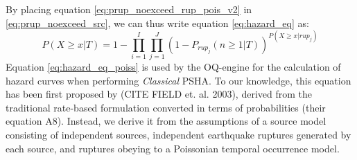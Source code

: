 By placing equation \ref{eq:prup_noexceed_rup_pois_v2} in \ref{eq:prup_noexceed_src}, we can thus
write equation \ref{eq:hazard_eq} as:
\begin{equation}
\label{eq:hazard_eq_poiss}
P(X \ge x | T) =  1 - \prod_{i=1}^{I} \prod_{j=1}^{J} (1 - P_{rup_{j}}(n \ge 1 | T))^{P(X \ge x | rup_{j})}
\end{equation}
Equation \ref{eq:hazard_eq_poiss} is used by the OQ-engine for the calculation of hazard curves when performing
\textit{Classical} PSHA. To our knowledge, this equation has been first proposed by (CITE FIELD et. al. 2003),
derived from the traditional rate-based formulation converted in terms of probabilities (their equation A8).
Instead, we derive it from the assumptions of a source model consisting of independent sources, independent
earthquake ruptures generated by each source, and ruptures obeying to a Poissonian temporal occurrence model.

